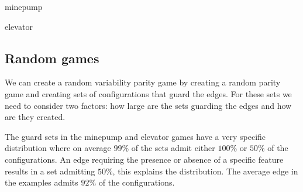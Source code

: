 

minepump

elevator

\subsection{Random games}
We can create a random variability parity game by creating a random parity game and creating sets of configurations that guard the edges. For these sets we need to consider two factors: how large are the sets guarding the edges and how are they created.

The guard sets in the minepump and elevator games have a very specific distribution where on average $99\%$ of the sets admit either $100\%$ or $50\%$ of the configurations. An edge requiring the presence or absence of a specific feature results in a set admitting $50\%$, this explains the distribution. The average edge in the examples admits $92\%$ of the configurations. 

